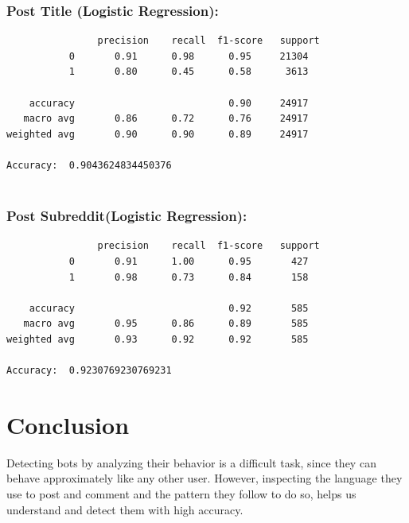 \documentclass{article}
\begin{document}
    \subsubsection{Post Title (Logistic Regression):}
         \begin{verbatim}
                precision    recall  f1-score   support
           0       0.91      0.98      0.95     21304
           1       0.80      0.45      0.58      3613

    accuracy                           0.90     24917
   macro avg       0.86      0.72      0.76     24917
weighted avg       0.90      0.90      0.89     24917

Accuracy:  0.9043624834450376
 
 \end{verbatim}

    \subsubsection{Post Subreddit(Logistic Regression):}

     \begin{verbatim}
                precision    recall  f1-score   support
           0       0.91      1.00      0.95       427
           1       0.98      0.73      0.84       158

    accuracy                           0.92       585
   macro avg       0.95      0.86      0.89       585
weighted avg       0.93      0.92      0.92       585

Accuracy:  0.9230769230769231 
 \end{verbatim}
 
 \section{Conclusion}
 Detecting bots by analyzing their behavior is a difficult task, since they can behave approximately like any other user. However, inspecting the language they use to post and comment and the pattern they follow to do so, helps us understand and detect them with high accuracy.
\end{document}
